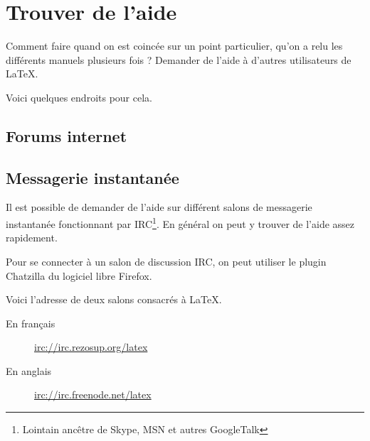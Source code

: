 \chapter{Trouver de l'aide}

\begin{prealable}
Comment faire quand on est coincée sur un point particulier, qu'on a relu les différents manuels plusieurs fois ? Demander de l'aide à d'autres utilisateurs de \LaTeX.

Voici quelques endroits pour cela.
\end{prealable}

\section{Forums internet}

\section{Messagerie instantanée}

Il est possible de demander de l'aide sur différent salons de messagerie instantanée fonctionnant par IRC\footnote{Lointain ancêtre de Skype, MSN et autres GoogleTalk}. En général on peut y trouver de l'aide assez rapidement.

Pour se connecter à un salon de discussion IRC, on peut utiliser le plugin Chatzilla du logiciel libre Firefox.

Voici l'adresse de deux salons consacrés à \LaTeX.

\begin{description}
\item[En français]\url{irc://irc.rezosup.org/latex}
\item[En anglais]\url{irc://irc.freenode.net/latex}
\end{description}